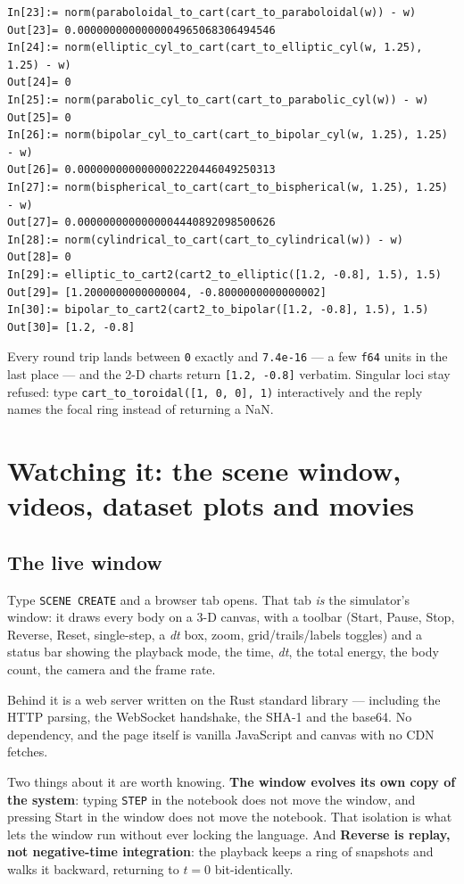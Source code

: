 \documentclass[11pt]{article}
\newcommand{\kw}[1]{\texttt{\uppercase{#1}}}
\newcommand{\code}[1]{\texttt{#1}}
\begin{document}
\begin{lstlisting}
In[23]:= norm(paraboloidal_to_cart(cart_to_paraboloidal(w)) - w)
Out[23]= 0.0000000000000004965068306494546
In[24]:= norm(elliptic_cyl_to_cart(cart_to_elliptic_cyl(w, 1.25), 1.25) - w)
Out[24]= 0
In[25]:= norm(parabolic_cyl_to_cart(cart_to_parabolic_cyl(w)) - w)
Out[25]= 0
In[26]:= norm(bipolar_cyl_to_cart(cart_to_bipolar_cyl(w, 1.25), 1.25) - w)
Out[26]= 0.0000000000000002220446049250313
In[27]:= norm(bispherical_to_cart(cart_to_bispherical(w, 1.25), 1.25) - w)
Out[27]= 0.0000000000000004440892098500626
In[28]:= norm(cylindrical_to_cart(cart_to_cylindrical(w)) - w)
Out[28]= 0
In[29]:= elliptic_to_cart2(cart2_to_elliptic([1.2, -0.8], 1.5), 1.5)
Out[29]= [1.2000000000000004, -0.8000000000000002]
In[30]:= bipolar_to_cart2(cart2_to_bipolar([1.2, -0.8], 1.5), 1.5)
Out[30]= [1.2, -0.8]
\end{lstlisting}

Every round trip lands between \code{0} exactly and \code{7.4e-16}
--- a few \code{f64} units in the last place --- and the 2-D charts
return \code{[1.2, -0.8]} verbatim. Singular loci stay refused: type
\code{cart\_to\_toroidal([1, 0, 0], 1)} interactively and the reply
names the focal ring instead of returning a NaN.

\section{Watching it: the scene window, videos, dataset plots and movies}

\subsection{The live window}

Type \kw{scene create} and a browser tab opens. That tab \emph{is} the
simulator's window: it draws every body on a 3-D canvas, with a toolbar
(Start, Pause, Stop, Reverse, Reset, single-step, a \emph{dt} box, zoom,
grid/trails/labels toggles) and a status bar showing the playback mode,
the time, \emph{dt}, the total energy, the body count, the camera and
the frame rate.

Behind it is a web server written on the Rust standard library ---
including the HTTP parsing, the WebSocket handshake, the SHA-1 and the
base64. No dependency, and the page itself is vanilla JavaScript and
canvas with no CDN fetches.

Two things about it are worth knowing. \textbf{The window evolves its
own copy of the system}: typing \kw{step} in the notebook does not move
the window, and pressing Start in the window does not move the notebook.
That isolation is what lets the window run without ever locking the
language. And \textbf{Reverse is replay, not negative-time
integration}: the playback keeps a ring of snapshots and walks it
backward, returning to $t=0$ bit-identically.
\end{document}
